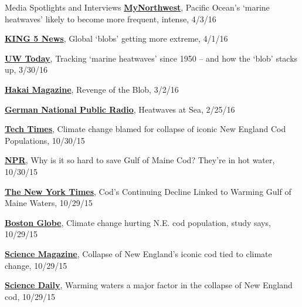 \documentclass{resume} %
\begin{document}
\begin{rSection}{Media Spotlights and Interviews}
\href{http://mynorthwest.com/11/2943491/Pacific-Oceans-marine-heatwaves-likely-to-become-more-frequent-intense}{\textbf{MyNorthwest}}, Pacific Ocean’s ‘marine heatwaves’ likely to become more frequent, intense, 4/3/16

\href{http://www.king5.com/tech/science/environment/turns-out-the-blob-isnt-alone/112940327}{\textbf{KING 5 News}}, Global ‘blobs’ getting more extreme, 4/1/16

\href{http://www.washington.edu/news/2016/03/30/tracking-marine-heatwaves-since-1950-and-how-the-blob-stacks-up/}{\textbf{UW Today}}, Tracking ‘marine heatwaves’ since 1950 – and how the ‘blob’ stacks up, 3/30/16

\href{http://www.hakaimagazine.com/article-short/revenge-blob}{\textbf{Hakai Magazine}}, Revenge of the Blob, 3/2/16 

\href{https://www.deutschlandfunk.de/klimaforschung-hitzewellen-auf-see.676.de.html?dram\%3Aarticle_id=346758}{\textbf{German National Public Radio}}, Heatwaves at Sea, 2/25/16

\href{http://www.techtimes.com/articles/101190/20151030/climate-change-blamed-for-collapse-of-iconic-new-england-cod-populations.htm}{\textbf{Tech Times}}, Climate change blamed for collapse of iconic New England Cod Populations, 10/30/15

\href{http://www.npr.org/sections/thesalt/2015/10/29/451942641/why-is-it-so-hard-to-save-gulf-of-maine-cod-theyre-in-hot-water}{\textbf{NPR}}, Why is it so hard to save Gulf of Maine Cod? They’re in hot water, 10/30/15

\href{http://www.nytimes.com/2015/10/30/science/cods-continuing-decline-traced-to-warming-gulf-of-maine-waters.html?_r=0}{\textbf{The New York Times}}, Cod’s Continuing Decline Linked to Warming Gulf of Maine Waters, 10/29/15

\href{https://www.bostonglobe.com/metro/2015/10/29/climate-change-seen-contributing-collapse-cod-stocks-off-new-england/WIMPUHnYWBwNBDJ0QpcqWO/story.html}{\textbf{Boston Globe}}, Climate change hurting N.E. cod population, study says, 10/29/15

\href{http://www.sciencemag.org/news/2015/10/collapse-new-england-s-iconic-cod-tied-climate-change}{\textbf{Science Magazine}}, Collapse of New England’s iconic cod tied to climate change, 10/29/15

\href{https://www.sciencedaily.com/releases/2015/10/151029150250.htm}{\textbf{Science Daily}}, Warming waters a major factor in the collapse of New England cod, 10/29/15


\end{rSection}
\end{document}
